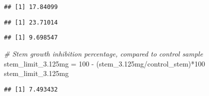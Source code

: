 \documentclass[
]{article}
\newenvironment{Shaded}{\begin{snugshade}}{\end{snugshade}}
\newcommand{\CommentTok}[1]{\textcolor[rgb]{0.56,0.35,0.01}{\textit{#1}}}
\newcommand{\DecValTok}[1]{\textcolor[rgb]{0.00,0.00,0.81}{#1}}
\newcommand{\FloatTok}[1]{\textcolor[rgb]{0.00,0.00,0.81}{#1}}
\newcommand{\FunctionTok}[1]{\textcolor[rgb]{0.00,0.00,0.00}{#1}}
\newcommand{\NormalTok}[1]{#1}
\newcommand{\OtherTok}[1]{\textcolor[rgb]{0.56,0.35,0.01}{#1}}
\newcommand{\SpecialCharTok}[1]{\textcolor[rgb]{0.00,0.00,0.00}{#1}}
\begin{document}
\begin{verbatim}
## [1] 17.84099
\end{verbatim}

\begin{Shaded}
\end{Shaded}

\begin{verbatim}
## [1] 23.71014
\end{verbatim}

\begin{Shaded}
\end{Shaded}

\begin{verbatim}
## [1] 9.698547
\end{verbatim}

\begin{Shaded}
\begin{Highlighting}[]
\CommentTok{\# Stem growth inhibition percentage, compared to control sample}
\NormalTok{stem\_limit\_3}\FloatTok{.125}\NormalTok{mg }\OtherTok{=} \DecValTok{100} \SpecialCharTok{{-}}\NormalTok{ (stem\_3}\FloatTok{.125}\NormalTok{mg}\SpecialCharTok{/}\NormalTok{control\_stem)}\SpecialCharTok{*}\DecValTok{100}
\NormalTok{stem\_limit\_3}\FloatTok{.125}\NormalTok{mg}
\end{Highlighting}
\end{Shaded}

\begin{verbatim}
## [1] 7.493432
\end{verbatim}

\begin{Shaded}
\end{Shaded}
\end{document}
